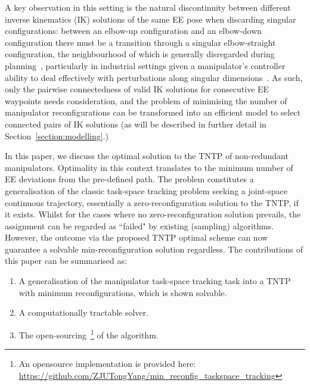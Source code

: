 \documentclass[letterpaper, 10 pt, conference]{ieeeconf}  %
\begin{document}
A key observation in this setting is the natural discontinuity between different inverse kinematics (IK) solutions of the same EE pose when discarding singular configurations: between an 
elbow-up configuration and an elbow-down configuration there must be a transition through a singular elbow-straight configuration, the neighbourhood of which is generally 
disregarded during planning~\cite{Mayorga1988Singularities}, particularly in industrial settings given a manipulator's controller ability to deal effectively with perturbations along singular dimensions~\cite{Xu2015Singularity}. 
As such, only the pairwise connectedness of valid IK solutions for consecutive EE waypoints needs consideration, and the problem of minimising the number of manipulator 
reconfigurations can be transformed into an efficient model to select connected pairs of IK solutions (as will be described in further detail in Section~\ref{section:modelling}.) 

In this paper, we discuss the optimal solution to the TNTP of non-redundant manipulators. Optimality in this context translates to the minimum number of EE deviations from the pre-defined path. The problem constitutes a generalisation of the classic task-space tracking problem seeking a joint-space continuous trajectory, essentially a zero-reconfiguration solution to the TNTP, if it exists. Whilst for the cases where no zero-reconfiguration solution prevails, the assignment can be regarded as ``failed" by existing (sampling) algorithms. However, the outcome via the proposed TNTP optimal scheme can now guarantee a solvable min-reconfiguration solution regardless. The contributions of this paper can be summarised as: 
\begin{enumerate}
\item A generalisation of the manipulator task-space tracking task into a TNTP with minimum reconfigurations, which is shown solvable. 
\item A computationally tractable solver. 
\item The open-sourcing~\footnote{An opensource implementation is provided here: \url{https://github.com/ZJUTongYang/min_reconfig_taskspace_tracking}} of the algorithm.
\end{enumerate}
\end{document}
